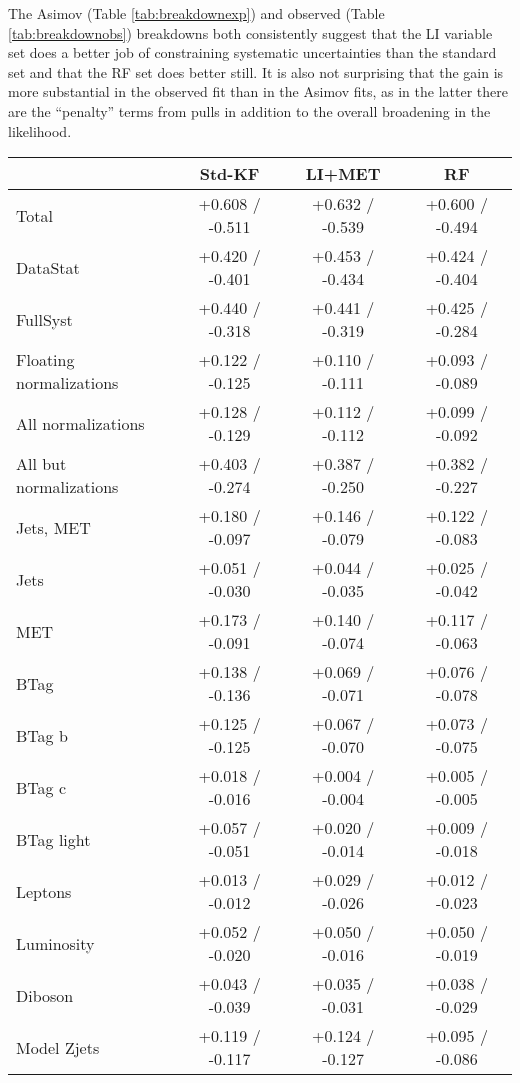 \begin{enumeate}
The Asimov (Table \ref{tab:breakdownexp}) and observed (Table \ref{tab:breakdownobs}) breakdowns both consistently suggest that the LI variable set does a better job of constraining systematic uncertainties than the standard set and that the RF set does better still.  It is also not surprising that the gain is more substantial in the observed fit than in the Asimov fits, as in the latter there are the ``penalty'' terms from pulls in addition to the overall broadening in the likelihood.

\begin{table}[!htbp]
\begin{center}
\begin{tabular}{lccc}
\hline\hline
 &Std-KF &LI+MET &RF\\
\hline
Total &  +0.608 / -0.511  &  +0.632 / -0.539  &  +0.600 / -0.494 \\
DataStat &  +0.420 / -0.401  &  +0.453 / -0.434  &  +0.424 / -0.404 \\
FullSyst &  +0.440 / -0.318  &  +0.441 / -0.319  &  +0.425 / -0.284 \\
Floating normalizations &  +0.122 / -0.125  &  +0.110 / -0.111  &  +0.093 / -0.089 \\
All normalizations &  +0.128 / -0.129  &  +0.112 / -0.112  &  +0.099 / -0.092 \\
All but normalizations &  +0.403 / -0.274  &  +0.387 / -0.250  &  +0.382 / -0.227 \\
\hline
Jets, MET &  +0.180 / -0.097  &  +0.146 / -0.079  &  +0.122 / -0.083 \\
Jets &  +0.051 / -0.030  &  +0.044 / -0.035  &  +0.025 / -0.042 \\
MET &  +0.173 / -0.091  &  +0.140 / -0.074  &  +0.117 / -0.063 \\
BTag &  +0.138 / -0.136  &  +0.069 / -0.071  &  +0.076 / -0.078 \\
BTag b &  +0.125 / -0.125  &  +0.067 / -0.070  &  +0.073 / -0.075 \\
BTag c &  +0.018 / -0.016  &  +0.004 / -0.004  &  +0.005 / -0.005 \\
BTag light &  +0.057 / -0.051  &  +0.020 / -0.014  &  +0.009 / -0.018 \\
Leptons &  +0.013 / -0.012  &  +0.029 / -0.026  &  +0.012 / -0.023 \\
Luminosity &  +0.052 / -0.020  &  +0.050 / -0.016  &  +0.050 / -0.019 \\
Diboson &  +0.043 / -0.039  &  +0.035 / -0.031  &  +0.038 / -0.029 \\
Model Zjets &  +0.119 / -0.117  &  +0.124 / -0.127  &  +0.095 / -0.086 \\

\end{tabular}
\end{center}
\end{table}
\end{enumeate}
